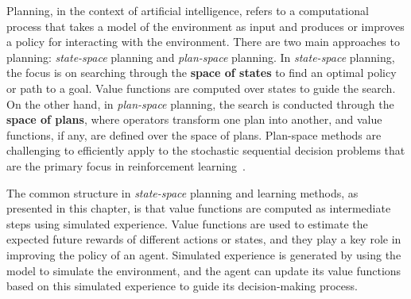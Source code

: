 \documentclass[../xlapes02]{subfiles}
\begin{document}
    Planning, in the context of artificial intelligence, refers to a computational process that takes a model of the environment as input and produces or improves a policy for interacting with the environment. There are two main approaches to planning: \emph{state-space} planning and \emph{plan-space} planning. In \emph{state-space} planning, the focus is on searching through the \textbf{space of states} to find an optimal policy or path to a goal. Value functions are computed over states to guide the search. On the other hand, in \emph{plan-space} planning, the search is conducted through the \textbf{space of plans}, where operators transform one plan into another, and value functions, if any, are defined over the space of plans. Plan-space methods are challenging to efficiently apply to the stochastic sequential decision problems that are the primary focus in reinforcement learning~\cite{sutton2018reinforcement}.

    The common structure in \emph{state-space} planning and learning methods, as presented in this chapter, is that value functions are computed as intermediate steps using simulated experience. Value functions are used to estimate the expected future rewards of different actions or states, and they play a key role in improving the policy of an agent. Simulated experience is generated by using the model to simulate the environment, and the agent can update its value functions based on this simulated experience to guide its decision-making process.

    \begin{center}
    \end{center}
\end{document}
